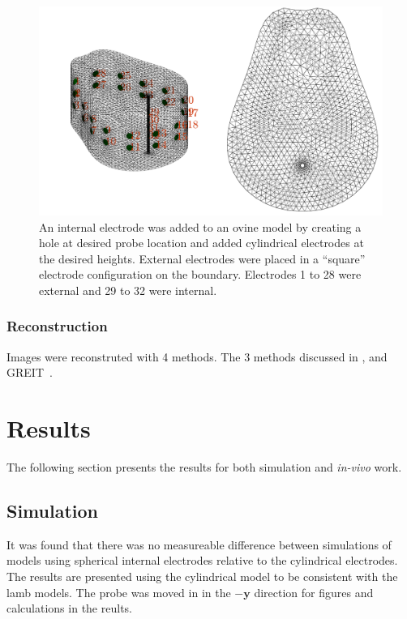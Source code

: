 \begin{figure}
    \centering
	\includegraphics[width=\textwidth]{chapter7-internal_elec_motion/imgs/lamb_model.pdf} 
	\caption[Ovine model with internal probe]{\label{fig:internal_lamb_model} 
	An internal electrode was added to an ovine model by creating a hole at desired probe
	location and added cylindrical electrodes at the desired heights. External electrodes
	were placed in a ``square'' electrode configuration on the boundary. Electrodes 1 to 28 were 
	external and 29 to 32 were internal.}
\end{figure}

\subsubsection{Reconstruction}
Images were reconstruted with 4 methods. The 3 methods discussed in , 
and GREIT~\parencite{grychtol_3d_2016}.

\section{Results}
The following section presents the results for both simulation and 
\emph{in-vivo} work.

\subsection{Simulation}
It was found that there was no measureable difference between 
simulations of models using spherical internal electrodes 
relative to the
cylindrical electrodes. The results are presented
using the cylindrical model to be consistent with the 
lamb models.
The probe was moved in in the $-\mathbf{y}$ direction for figures and calculations
in the reults.

